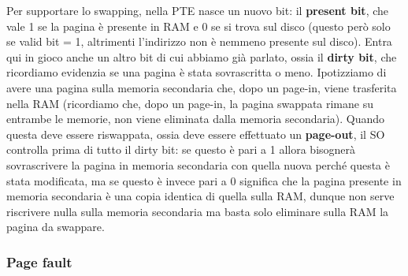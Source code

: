 \documentclass[11pt, a4paper, titlepage, oneside]{scrbook}
\begin{document}
Per supportare lo swapping, nella PTE nasce un nuovo bit: il \textbf{present bit}, che vale 1 se la pagina è presente in RAM e 0 se si trova sul disco (questo però solo se valid bit = 1, altrimenti l'indirizzo non è nemmeno presente sul disco). Entra qui in gioco anche un altro bit di cui abbiamo già parlato, ossia il \textbf{dirty bit}, che ricordiamo evidenzia se una pagina è stata sovrascritta o meno. Ipotizziamo di avere una pagina sulla memoria secondaria che, dopo un page-in, viene trasferita nella RAM (ricordiamo che, dopo un page-in, la pagina swappata rimane su entrambe le memorie, non viene eliminata dalla memoria secondaria). Quando questa deve essere riswappata, ossia deve essere effettuato un \textbf{page-out}, il SO controlla prima di tutto il dirty bit: se questo è pari a 1 allora bisognerà sovrascrivere la pagina in memoria secondaria con quella nuova perché questa è stata modificata, ma se questo è invece pari a 0 significa che la pagina presente in memoria secondaria è una copia identica di quella sulla RAM, dunque non serve riscrivere nulla sulla memoria secondaria ma basta solo eliminare sulla RAM la pagina da swappare. 

\subsubsection*{Page fault}
\end{document}
